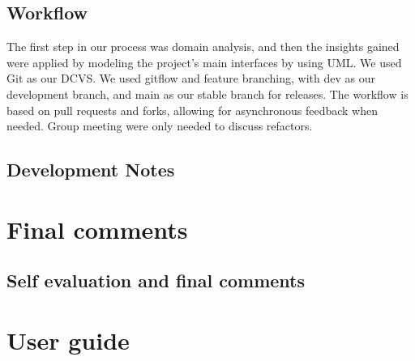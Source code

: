 \documentclass[a4paper,12pt]{report}
\begin{document}



\section{Workflow}
The first step in our process was domain analysis, and then the insights gained were applied by modeling 
the project's main interfaces by using UML.
We used Git as our DCVS. We used gitflow and feature branching, with dev as our development branch,
and main as our stable branch for releases. The workflow is based on pull requests and forks, allowing for asynchronous feedback when needed.
Group meeting were only needed to discuss refactors. 





\section{Development Notes}




\chapter{Final comments}

\section{Self evaluation and final comments}




\appendix
\chapter{User guide}
\end{document}
